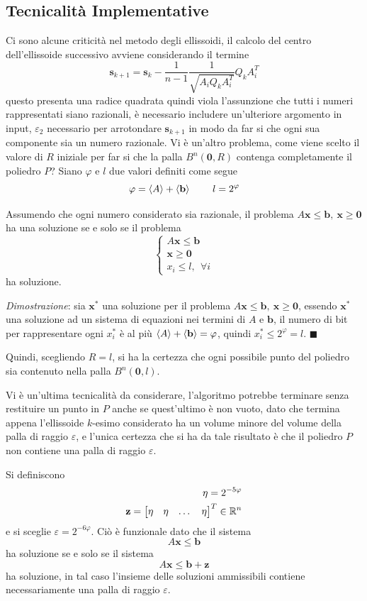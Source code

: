 \documentclass[10pt, letterpaper]{report}
\newcommand{\bb}{{\mathbf{b}}}
\newcommand{\bs}{{\mathbf{s}}}
\newcommand{\x}{{\mathbf{x}}}
\begin{document}
\subsection{Tecnicalità Implementative}
Ci sono alcune criticità nel metodo degli ellissoidi, il calcolo del centro dell'ellissoide successivo avviene considerando il termine 
$$ \bs_{k+1}=\bs_k-\frac{1}{n-1}\frac{1}{\sqrt{A_iQ_kA_i^T}}Q_kA_i^T$$
questo presenta una radice quadrata quindi viola l'assunzione che tutti i numeri rappresentati siano razionali, è necessario includere un'ulteriore argomento in input, $\varepsilon_2$ necessario per arrotondare $\bs_{k+1}$ in modo da far si che ogni sua componente sia un numero razionale. Vi è un'altro problema, come viene scelto il valore di $R$ iniziale per far si che la palla $B^n(\mathbf 0,R)$ contenga completamente il poliedro $P$?\bigskip 
Siano $\varphi$ e $l$ due valori definiti come segue\begin{equation}
    \varphi = \bra A +\bra\bb \ \ \ \ \ \ \ l=2^\varphi
\end{equation}
\begin{proposizione}
    Assumendo che ogni numero considerato sia razionale, il problema $A\x\le \bb, \ \x\ge \mathbf 0$ ha una soluzione se e solo se il problema$$ \begin{cases}
        A\x\le \bb\\ \x\ge \mathbf 0\\ 
        x_i\le l, \ \ \forall i 
    \end{cases}$$
    ha soluzione.
\end{proposizione}
\textit{Dimostrazione}: sia $\x^*$ una soluzione per il problema $A\x\le \bb, \ \x\ge \mathbf 0$, essendo $\x^*$ una soluzione ad un sistema di equazioni nei termini di $A$ e $\bb$, il numero di bit per rappresentare ogni $x_i^*$ è al più $\bra A +\bra \bb=\varphi $, quindi $x_i^*\le 2^\varphi = l$. \hfill$\blacksquare$

Quindi, scegliendo $R=l$, si ha la certezza che ogni possibile punto del poliedro sia contenuto nella palla $B^n(\mathbf 0,l)$.\bigskip

Vi è un'ultima tecnicalità da considerare, l'algoritmo potrebbe terminare senza restituire un punto in $P$ anche se quest'ultimo è non vuoto, dato che termina appena l'ellissoide $k$-esimo considerato ha un volume minore del volume della palla di raggio $\varepsilon$, e l'unica certezza che si ha da tale risultato è che il poliedro $P$ non contiene una palla di raggio $\varepsilon$.

Si definiscono \begin{eqnarray*}
    \eta  = 2^{-5\varphi}\\ 
    \mathbf z = \begin{bmatrix}
        \eta&\eta&\dots &\eta
    \end{bmatrix}^T\in{\mathbb R}^n
\end{eqnarray*}
e si sceglie $\varepsilon=2^{-6\varphi}$. Ciò è funzionale dato che il sistema $$A\x\le\bb$$ ha soluzione se e solo se il sistema $$A\x\le\bb+\mathbf z$$
ha soluzione, in tal caso l'insieme delle soluzioni ammissibili contiene necessariamente una palla di raggio $\varepsilon$.
\end{document}
